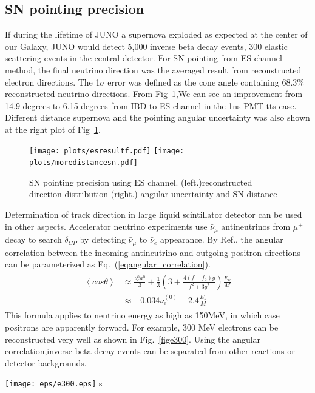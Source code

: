 \documentclass[a4paper,10pt]{cpc-hepnp}
\begin{document}
\subsection{SN pointing precision}
If during the lifetime of JUNO a supernova exploded as expected at the center of
our Galaxy, JUNO would detect 5,000 inverse beta decay
events, 300 elastic scattering events in the central detector.
For SN pointing from ES channel method, the final neutrino direction was the
averaged result from reconstructed electron directions.
The 1$\sigma$ error was defined as the cone angle containing 68.3\%
reconstructed neutrino directions. From Fig~\ref{sn_dir},We can see an 
improvement from 14.9 degrees to 6.15 degrees from IBD to ES channel
in the 1ns PMT tts case. Different distance
supernova and the pointing angular uncertainty was also
shown at the right plot of Fig~\ref{sn_dir}.
\begin{figure}[htbp]
\centering %
\texttt{[image: plots/esresultf.pdf]}
\hfill
\texttt{[image: plots/moredistancesn.pdf]}
\caption{\label{sn_dir} SN pointing precision using ES channel.
(left.)reconstructed direction distribution (right.) angular uncertainty and SN
distance}
\end{figure}
Determination of track direction in large liquid scintillator detector can be
used in other aspects. Accelerator neutrino experiments use $\bar{\nu}_{\mu}$ 
antineutrinos from $\mu^{+}$ decay  to search $\delta_{CP}$ by detecting
$\bar{\nu}_{\mu}$  to $\bar{\nu}_{e}$  appearance.
By Ref.\cite{angular_corrrelation}, the angular correlation between the 
incoming antineutrino and outgoing positron directions can be parameterized
as Eq.~(\ref{eqangular_correlation}).
\begin{eqnarray}
\label{eqangular_correlation}
\begin{aligned}
\left<cos\theta\right>&\approx \frac{\nu^{0}_{e}a^{0}}{3}+\frac{1}{3}\left(3+\frac{4(f+f_{2})g}{f^{2}+3g^{2}}\right)\frac{E_{\nu}}{M}\\
&\approx -0.034\nu^{(0)}_{e} + 2.4\frac{E_{\nu}}{M}
\end{aligned}
\end{eqnarray}
This formula applies to neutrino energy as high as 150MeV, in which case 
positrons are apparently forward. For example, 300 MeV electrons can be
reconstructed very well as shown in Fig.~\ref{fige300}. Using the
angular correlation,inverse beta decay events can be separated from other
reactions or detector backgrounds.
\begin{center}
\texttt{[image: eps/e300.eps]}
s
\end{center}
\end{document}
